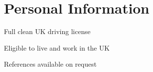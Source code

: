 \documentclass[a4paper]{deedy-resume} %
\begin{document}

\newpage %


\begin{minipage}[t]{0.33\textwidth} %

\section{Personal Information}
\vspace{\topsep}
\begin{tightitemize}
\item Full clean UK driving license
\item Eligible to live and work in the UK
\item References available on request
\end{tightitemize}

\end{minipage} %
\hfill
\end{document}
